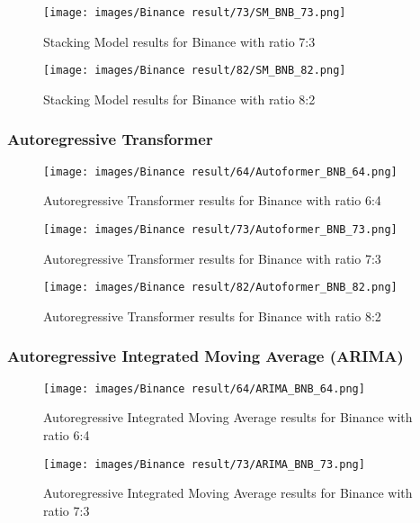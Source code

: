 \documentclass{ieeeojies}
\begin{document}
\begin{figure}[H]
  \centering
\texttt{[image: images/Binance result/73/SM\_BNB\_73.png]}\\
  \caption{Stacking Model results for Binance with ratio 7:3}
  \label{fig:stackmodel_bn_73}
\end{figure}

\begin{figure}[H]
  \centering
\texttt{[image: images/Binance result/82/SM\_BNB\_82.png]}
  \caption{Stacking Model results for Binance with ratio 8:2}
  \label{fig:stackmodel_bn_82}
\end{figure}


\subsubsection{Autoregressive Transformer}

\begin{figure}[H]
  \centering
\texttt{[image: images/Binance result/64/Autoformer\_BNB\_64.png]}
  \caption{Autoregressive Transformer results for Binance with ratio 6:4}
  \label{fig:autoformer_bn_64}
\end{figure}
\begin{figure}[H]
  \centering
\texttt{[image: images/Binance result/73/Autoformer\_BNB\_73.png]}
  \caption{Autoregressive Transformer results for Binance with ratio 7:3}
  \label{fig:autoformer_bn_73}
\end{figure}
\begin{figure}[H]
  \centering
\texttt{[image: images/Binance result/82/Autoformer\_BNB\_82.png]}
  \caption{Autoregressive Transformer results for Binance with ratio 8:2}
  \label{fig:autoformer_bn_82}
\end{figure}


\subsubsection{Autoregressive Integrated Moving Average (ARIMA)}
\begin{figure}[H]
  \centering
\texttt{[image: images/Binance result/64/ARIMA\_BNB\_64.png]}\\
  \caption{Autoregressive Integrated Moving Average results for Binance with ratio 6:4}
  \label{fig:arima_bn_64}
\end{figure}

\begin{figure}[H]
  \centering
\texttt{[image: images/Binance result/73/ARIMA\_BNB\_73.png]}\\
  \caption{Autoregressive Integrated Moving Average results for Binance with ratio 7:3}
  \label{fig:arima_bn_73}
\end{figure}
\end{document}
